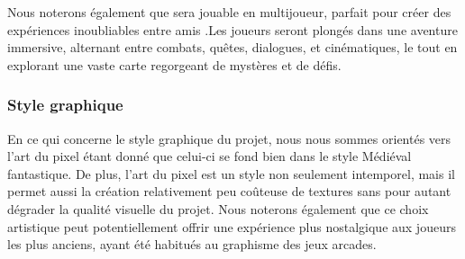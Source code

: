 Nous noterons également que \textit{\gameName} sera jouable en multijoueur, parfait pour créer des expériences  inoubliables entre amis .Les joueurs seront plongés dans une aventure immersive, alternant entre combats, quêtes, dialogues, et cinématiques, le tout en explorant une vaste carte regorgeant de mystères et de défis.

\subsubsection*{\hspace*{0.6cm}Style graphique}

En ce qui concerne le style graphique du projet, nous nous sommes orientés vers l’art du pixel étant donné que celui-ci se fond bien dans le style Médiéval fantastique. De plus, l’art du pixel est un style non seulement intemporel, mais il permet aussi la création relativement peu coûteuse de textures sans pour autant dégrader la qualité visuelle du projet. Nous noterons également que ce choix artistique peut potentiellement offrir une expérience plus nostalgique aux joueurs les plus anciens, ayant été habitués au graphisme des jeux arcades.